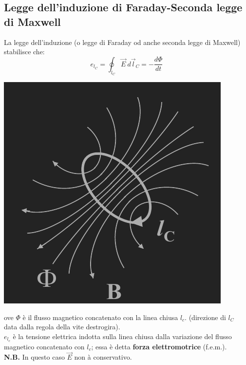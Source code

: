 \documentclass{article}
\begin{document}
\subsection{Legge dell'induzione di Faraday-Seconda legge di Maxwell}
La legge dell'induzione (o legge di Faraday
od anche seconda legge di Maxwell)
stabilisce che:
\[
    e_{l_C} = \oint_{l_C}
    \vec E \ d\vec l_C = -\frac{d \Phi}{dt}
\]
\begin{center}
    \includegraphics[scale=0.5]{Image/Legge di Faraday.png}
\end{center}
ove $\Phi$ è il flusso magnetico concatenato con
la linea chiusa $l_c$. (direzione di $l_C$ data dalla
regola della vite destrogira).\\
$e_{l_c}$ è la tensione elettrica indotta sulla
linea chiusa dalla variazione del flusso
magnetico concatenato con $l_c$; essa è detta
\textbf{forza elettromotrice} (f.e.m.).
\vspace*{0.1cm}\\
\textbf{N.B.} In questo caso $\vec E$ non à conservativo.
\end{document}
